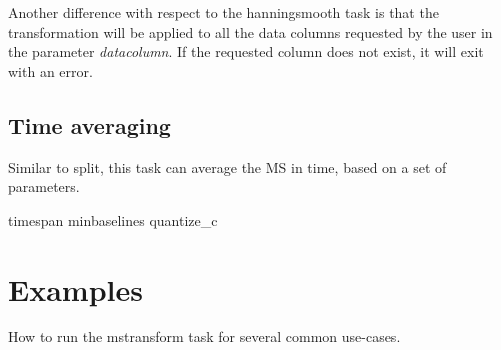 Another difference with respect to the hanningsmooth task is that the transformation will be 
applied to all the data columns requested by the user in the parameter {\it datacolumn}. If the 
requested column does not exist, it will exit with an error. 

\subsection{Time averaging}
Similar to split, this task can average the MS in time, based on a set of parameters.

timespan
minbaselines
quantize_c


\section{Examples}\label{Sec:Examples}
How to run the mstransform task for several common use-cases.


